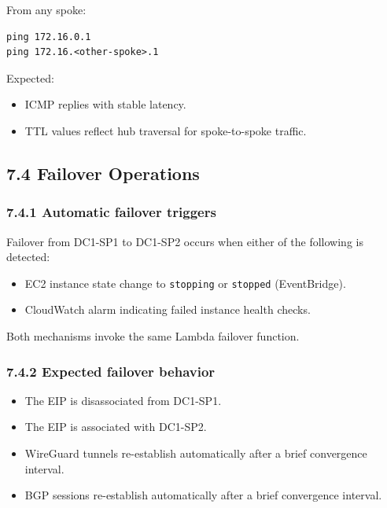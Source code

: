 \documentclass[11pt]{article}
\begin{document}
From any spoke:
\begin{verbatim}
ping 172.16.0.1
ping 172.16.<other-spoke>.1
\end{verbatim}

Expected:
\begin{itemize}
  \item ICMP replies with stable latency.
  \item TTL values reflect hub traversal for spoke-to-spoke traffic.
\end{itemize}

%
%
\subsection{7.4 Failover Operations}
\label{sec:failover-operations}

\subsubsection{7.4.1 Automatic failover triggers}
\label{sec:automatic-failover-triggers}

Failover from DC1-SP1 to DC1-SP2 occurs when either of the following is detected:
\begin{itemize}
  \item EC2 instance state change to \texttt{stopping} or \texttt{stopped} (EventBridge).
  \item CloudWatch alarm indicating failed instance health checks.
\end{itemize}

Both mechanisms invoke the same Lambda failover function.

\subsubsection{7.4.2 Expected failover behavior}
\label{sec:expected-failover-behavior}

\begin{itemize}
  \item The EIP is disassociated from DC1-SP1.
  \item The EIP is associated with DC1-SP2.
  \item WireGuard tunnels re-establish automatically after a brief convergence interval.
  \item BGP sessions re-establish automatically after a brief convergence interval.
\end{itemize}
\end{document}
